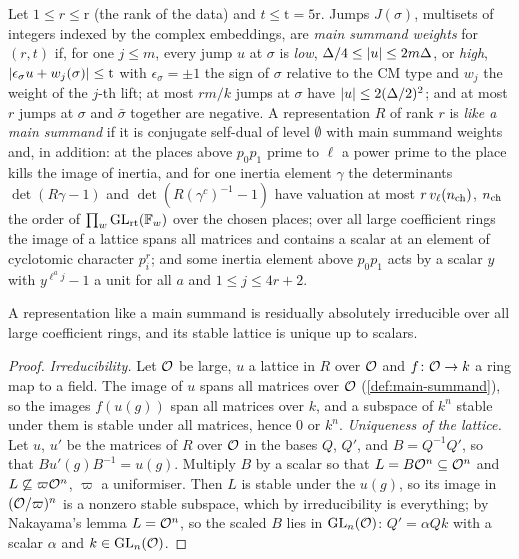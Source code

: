 \begin{definition}\label{def:main-summand}
Let $1\le r\le\mathrm{r}$ (the rank of the data) and $t\le\mathrm t=5\mathrm r$. Jumps $J(\sigma)$, multisets of integers indexed by the complex embeddings, are \emph{main summand weights} for $(r,t)$ if, for one $j\le m$, every jump $u$
at $\sigma$ is \emph{low}, $\Delta/4\le\lvert u\rvert\le2m\Delta$, or \emph{high}, $\lvert \epsilon_\sigma u+w_j(\sigma)\rvert\le\mathrm t$ with $\epsilon_\sigma=\pm1$ the sign of $\sigma$ relative to the CM type and $w_j$ the weight of the $j$-th lift; at
most $rm/k$ jumps at $\sigma$ have $\lvert u\rvert\le2(\Delta/2)^2$; and at most $r$ jumps at $\sigma$ and $\bar\sigma$ together are negative. A representation $R$ of rank $r$ is \emph{like a main summand} if it is conjugate self-dual of
level $\emptyset$ with main summand weights and, in addition: at the places above $p_0p_1$ prime to $\ell$ a power prime to the place kills the image of inertia, and for one inertia element $\gamma$ the determinants
$\det(R\gamma-1)$ and $\det(R(\gamma^c)^{-1}-1)$ have valuation at most $r\,v_\ell(n_{\rm ch})$, $n_{\rm ch}$ the order of $\prod_w\operatorname{GL}_{\mathrm r\mathrm t}(\mathbb{F}_w)$ over the chosen places; over all large coefficient rings the image of a
lattice spans all matrices and contains a scalar at an element of cyclotomic character $p_i^r$; and some inertia element above $p_0p_1$ acts by a scalar $y$ with $y^{\ell^aj}-1$ a unit for all $a$ and $1\le j\le4r+2$.
\end{definition}

\begin{proposition}\label{prop:main-summands}
A representation like a main summand is residually absolutely irreducible over all large coefficient rings, and its stable lattice is unique up to scalars.
\end{proposition}

\begin{proof}
\emph{Irreducibility.} Let $\mathcal{O}$ be large, $u$ a lattice in $R$ over $\mathcal{O}$ and $f\colon\mathcal{O}\to k$ a ring map to a field. The image of $u$ spans all matrices over $\mathcal{O}$ (\cref{def:main-summand}), so the images $f(u(g))$ span all matrices
over $k$, and a subspace of $k^n$ stable under them is stable under all matrices, hence $0$ or $k^n$. \emph{Uniqueness of the lattice.} Let $u$, $u'$ be the matrices of $R$ over $\mathcal{O}$ in the bases $Q$, $Q'$, and $B=Q^{-1}Q'$, so that
$Bu'(g)B^{-1}=u(g)$. Multiply $B$ by a scalar so that $L=B\mathcal{O}^n\subseteq\mathcal{O}^n$ and $L\not\subseteq\varpi\mathcal{O}^n$, $\varpi$ a uniformiser. Then $L$ is stable under the $u(g)$, so its image in $(\mathcal{O}/\varpi)^n$ is a nonzero stable subspace,
which by irreducibility is everything; by Nakayama's lemma $L=\mathcal{O}^n$, so the scaled $B$ lies in $\operatorname{GL}_n(\mathcal{O})$: $Q'=\alpha Qk$ with a scalar $\alpha$ and $k\in\operatorname{GL}_n(\mathcal{O})$.
\end{proof}

